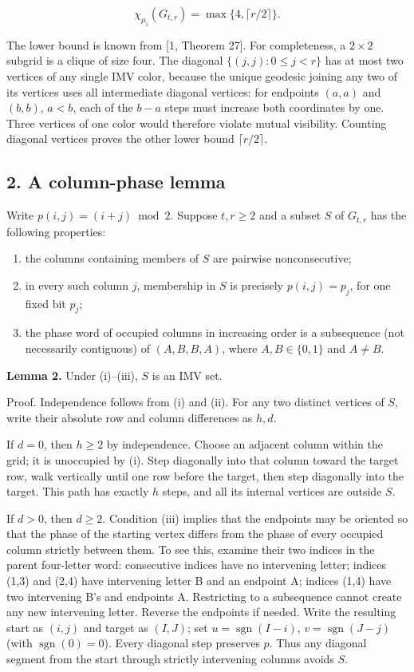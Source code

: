 \documentclass[
  11pt,
]{article}
\begin{document}
\[\chi_{\mu_i}(G_{t,r})=\max\{4,\lceil r/2\rceil\}.\]

The lower bound is known from {[}1, Theorem 27{]}. For completeness, a
\(2\times2\) subgrid is a clique of size four. The diagonal
\(\{(j,j):0\le j<r\}\) has at most two vertices of any single IMV color,
because the unique geodesic joining any two of its vertices uses all
intermediate diagonal vertices: for endpoints \((a,a)\) and \((b,b)\),
\(a<b\), each of the \(b-a\) steps must increase both coordinates by
one. Three vertices of one color would therefore violate mutual
visibility. Counting diagonal vertices proves the other lower bound
\(\lceil r/2\rceil\).

\subsection{2. A column-phase lemma}\label{a-column-phase-lemma}

Write \(p(i,j)=(i+j)\bmod2\). Suppose \(t,r\ge2\) and a subset \(S\) of
\(G_{t,r}\) has the following properties:

\begin{enumerate}
\def\labelenumi{(\roman{enumi})}
\item
  the columns containing members of \(S\) are pairwise nonconsecutive;
\item
  in every such column \(j\), membership in \(S\) is precisely
  \(p(i,j)=p_j\), for one fixed bit \(p_j\);
\item
  the phase word of occupied columns in increasing order is a
  subsequence (not necessarily contiguous) of \((A,B,B,A)\), where
  \(A,B\in\{0,1\}\) and \(A\ne B\).
\end{enumerate}

\textbf{Lemma 2.} Under (i)--(iii), \(S\) is an IMV set.

Proof. Independence follows from (i) and (ii). For any two distinct
vertices of \(S\), write their absolute row and column differences as
\(h,d\).

If \(d=0\), then \(h\ge2\) by independence. Choose an adjacent column
within the grid; it is unoccupied by (i). Step diagonally into that
column toward the target row, walk vertically until one row before the
target, then step diagonally into the target. This path has exactly
\(h\) steps, and all its internal vertices are outside \(S\).

If \(d>0\), then \(d\ge2\). Condition (iii) implies that the endpoints
may be oriented so that the phase of the starting vertex differs from
the phase of every occupied column strictly between them. To see this,
examine their two indices in the parent four-letter word: consecutive
indices have no intervening letter; indices (1,3) and (2,4) have
intervening letter B and an endpoint A; indices (1,4) have two
intervening B's and endpoints A. Restricting to a subsequence cannot
create any new intervening letter. Reverse the endpoints if needed.
Write the resulting start as \((i,j)\) and target as \((I,J)\); set
\(u=\operatorname{sgn}(I-i)\), \(v=\operatorname{sgn}(J-j)\) (with
\(\operatorname{sgn}(0)=0\)). Every diagonal step preserves \(p\). Thus
any diagonal segment from the start through strictly intervening columns
avoids \(S\).
\end{document}
